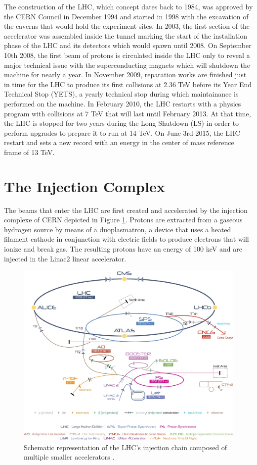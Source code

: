   The construction of the LHC, which concept dates back to 1984, was approved by the CERN Council in December 1994 and started in 1998 with the excavation of the caverns that would hold the experiment sites. In 2003, the first section of the accelerator was assembled inside the tunnel marking the start of the installation phase of the LHC and its detectors which would spawn until 2008. On September 10th 2008, the first beam of protons is circulated inside the LHC only to reveal a major technical issue with the superconducting magnets which will shutdown the machine for nearly a year. In November 2009, reparation works are finished just in time for the LHC to produce its first collisions at 2.36 TeV before its Year End Technical Stop (YETS), a yearly technical stop during which maintainance is performed on the machine. In February 2010, the LHC restarts with a physics program with collisions at 7 TeV that will last until February 2013. At that time, the LHC is stopped for two years during the Long Shutdown (LS) in order to perform upgrades to prepare it to run at 14 TeV. On June 3rd 2015, the LHC restart and sets a new record with an energy in the center of mass reference frame of 13 TeV.

  \section{The Injection Complex}

    The beams that enter the LHC are first created and accelerated by the injection complexe of CERN depicted in Figure \ref{fig:I-2-injection-chain}. Protons are extracted from a gaseous hydrogen source by means of a duoplasmatron, a device that uses a heated filament cathode in conjunction with electric fields to produce electrons that will ionize and break gas. The resulting protons have an energy of 100 keV and are injected in the Linac2 linear accelerator. \\

		\begin{figure}[h!]
			\centering
			\includegraphics[width = 12cm]{img/I-2-LHC/injectors.png}
			\caption{Schematic representation of the LHC's injection chain composed of multiple smaller accelerators \Cite{TE-EPC-LPC}.}
			\label{fig:I-2-injection-chain}
		\end{figure}

